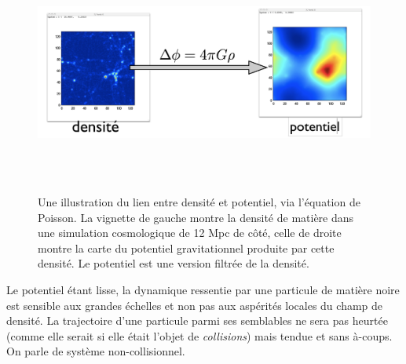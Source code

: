 \begin{figure}[htbp]
	\centering
		\includegraphics[height=8cm]{figs/poisson.png}
	\caption[Une illustration du lien entre densité et potentiel, via l'équation de Poisson.]{Une illustration du lien entre densité et potentiel, via l'équation de Poisson. La vignette de gauche montre la densité de matière dans une simulation cosmologique de 12 Mpc de côté, celle de droite montre la carte du potentiel gravitationnel produite par cette densité. Le potentiel est une version filtrée de la densité.} 
	\label{f:poisson}
\end{figure}

Le potentiel étant lisse, la dynamique ressentie par une particule de matière noire est sensible aux grandes échelles et non pas aux aspérités locales du champ de densité. La trajectoire d'une particule parmi ses semblables ne sera pas heurtée (comme elle serait si elle était l'objet de \textit{collisions}) mais tendue et sans à-coups. On parle de système non-collisionnel.

